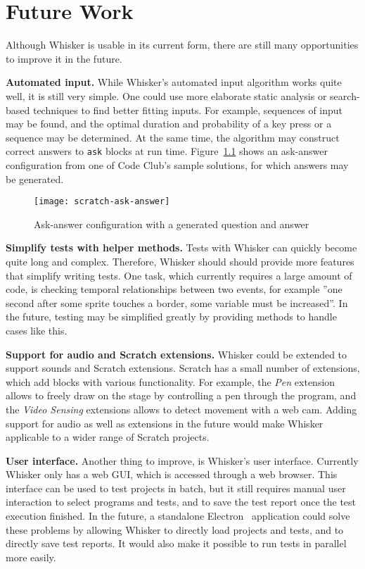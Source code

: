 \chapter{Future Work}
\label{cha:future_work}

Although Whisker is usable in its current form,
there are still many opportunities to improve it in the future.
\parspace

\textbf{Automated input.}
While Whisker's automated input algorithm works quite well, it is still very simple.
One could use more elaborate static analysis or search-based techniques to find better fitting inputs.
For example, sequences of input may be found, and the optimal duration and probability of a key press or a sequence may be determined.
At the same time, the algorithm may construct correct answers to \texttt{ask} blocks at run time.
Figure~\ref{fig:generated_ask_answer} shows an ask-answer configuration from one of Code Club's sample solutions,
for which answers may be generated.

\begin{figure}[htpb]
    \centering
    \texttt{[image: scratch-ask-answer]}
    \caption{Ask-answer configuration with a generated question and answer}
    \label{fig:generated_ask_answer}
\end{figure}


\textbf{Simplify tests with helper methods.}
Tests with Whisker can quickly become quite long and complex.
Therefore, Whisker should should provide more features that simplify writing tests.
One task, which currently requires a large amount of code,
is checking temporal relationships between two events,
for example ''one second after some sprite touches a border, some variable must be increased''.
In the future, testing may be simplified greatly by providing methods to handle cases like this.
\parspace

\textbf{Support for audio and Scratch extensions.}
Whisker could be extended to support sounds and Scratch extensions.
Scratch has a small number of extensions, which add blocks with various functionality.
For example, the \textit{Pen} extension allows to freely draw on the stage by controlling a pen through the program,
and the \textit{Video Sensing} extensions allows to detect movement with a web cam.
Adding support for audio as well as extensions in the future would make Whisker applicable to a wider range of Scratch projects.
\parspace

\textbf{User interface.}
Another thing to improve, is Whisker's user interface.
Currently Whisker only has a web GUI, which is accessed through a web browser.
This interface can be used to test projects in batch, but it still requires manual user interaction to select programs and tests,
and to save the test report once the test execution finished.
In the future, a standalone Electron~\cite{electron} application could solve these problems by allowing Whisker to directly load projects and tests,
and to directly save test reports.
It would also make it possible to run tests in parallel more easily.
\parspace

